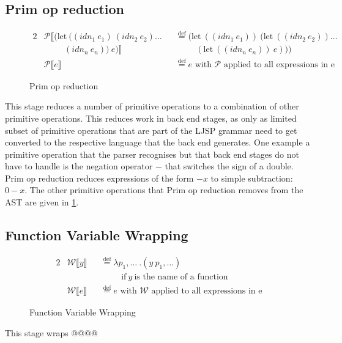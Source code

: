 \documentclass[11pt]{report}
\newcommand{\eqdef}{\stackrel{\text{def}}{=}}%
\begin{document}
\subsection{Prim op reduction}
\begin{figure}[ht]
\begin{alignat*}{2}
&\mathcal{P}\llbracket (\text{let}\ ((idn_1\ e_1)\ (idn_2\ e_2)\dots &&\eqdef (\text{let}\ ((idn_1\ e_1))\ (\text{let}\ ((idn_2\ e_2)) \dots \\
&\hspace{1cm} (idn_n\ e_n))\ e)\rrbracket &&\hspace{1cm}(\text{let}\ ((idn_n\ e_n))\ e)))\\
&\mathcal{P}\llbracket e \rrbracket && \eqdef e\text{ with $\mathcal{P}$ applied to all expressions in e}
\end{alignat*}
\caption{Prim op reduction}
\label{primopreduction}
\end{figure}
This stage reduces a number of primitive operations to a combination of other primitive operations. This reduces work in back end stages, as only as limited subset of primitive operations that are part of the LJSP grammar need to get converted to the respective language that the back end generates. One example a primitive operation that the parser recognises but that back end stages do not have to handle is the negation operator $-$ that switches the sign of a double. Prim op reduction reduces expressions of the form $-x$ to simple subtraction: $0-x$. The other primitive operations that Prim op reduction removes from the AST are given in \ref{primopreduction}.

\subsection{Function Variable Wrapping}
\begin{figure}[ht]
\begin{alignat*}{2}
&\mathcal{W}\llbracket y \rrbracket && \eqdef \lambda p_1,\dots~.(y~p_1,\dots)\\
&&&\hspace{1cm}\text{if}~y~\text{is the name of a function}\\
&\mathcal{W}\llbracket e \rrbracket && \eqdef e\text{ with $\mathcal{W}$ applied to all expressions in e}
\end{alignat*}
\caption{Function Variable Wrapping}
\label{fvarwrapping}
\end{figure}
This stage wraps @@@@ %
\end{document}
